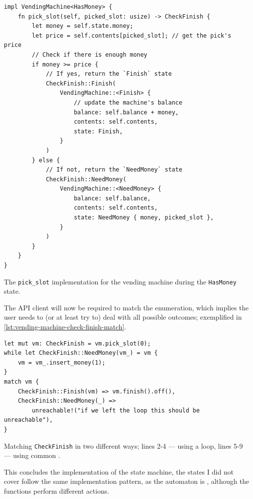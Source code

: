 \begin{listing}
    \begin{verbatim}
impl VendingMachine<HasMoney> {
    fn pick_slot(self, picked_slot: usize) -> CheckFinish {
        let money = self.state.money;
        let price = self.contents[picked_slot]; // get the pick's price
        // Check if there is enough money
        if money >= price {
            // If yes, return the `Finish` state
            CheckFinish::Finish(
                VendingMachine::<Finish> {
                    // update the machine's balance
                    balance: self.balance + money,
                    contents: self.contents,
                    state: Finish,
                }
            )
        } else {
            // If not, return the `NeedMoney` state
            CheckFinish::NeedMoney(
                VendingMachine::<NeedMoney> {
                    balance: self.balance,
                    contents: self.contents,
                    state: NeedMoney { money, picked_slot },
                }
            )
        }
    }
}
\end{verbatim}
    \caption{The \texttt{pick\_slot} implementation for the vending machine during the \texttt{HasMoney} state.}
    \label{lst:vending-machine-pick-slot}
\end{listing}

The \gls{API} client will now be required to match the enumeration,
which implies the user needs to (or at least try to) deal with all possible outcomes;
exemplified in \autoref{lst:vending-machine-check-finish-match}.

\begin{listing}
    \begin{verbatim}
let mut vm: CheckFinish = vm.pick_slot(0);
while let CheckFinish::NeedMoney(vm_) = vm {
    vm = vm_.insert_money(1);
}
match vm {
    CheckFinish::Finish(vm) => vm.finish().off(),
    CheckFinish::NeedMoney(_) =>
        unreachable!("if we left the loop this should be unreachable"),
}
\end{verbatim}
    \caption{
        Matching \textcolor{structblue}{\texttt{CheckFinish}} in two different ways;
        lines 2-4 --- using a  loop,
        lines 5-9 --- using common .
    }
    \label{lst:vending-machine-check-finish-match}
\end{listing}

This concludes the implementation of the state machine,
the states I did not cover follow the same implementation pattern,
as the automaton is , although the functions perform different actions.

